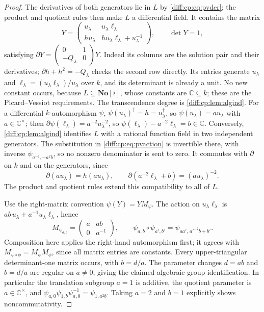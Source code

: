 \documentclass[11pt,letterpaper]{article}
\numberwithin{equation}{section}
\theoremstyle{definition}
\theoremstyle{remark}
\newcommand{\SC}{\mathbf{No}[i]}
\newcommand{\C}{\mathbb C}
\newcommand{\der}{\partial}
\begin{document}
\begin{proof}
The derivatives of both generators lie in $L$ by
\cref{diff:cp:eq:pvder}; the product and quotient rules then
make $L$ a differential field. It contains the matrix
\[
 Y=\begin{pmatrix}u_{\lambda}&u_{\lambda}\ell_{\lambda}\\
 hu_{\lambda}&hu_{\lambda}\ell_{\lambda}+u_{\lambda}^{-1}\end{pmatrix},
 \qquad \det Y=1,
\]
satisfying
$\der Y=\left(\begin{smallmatrix}0&1\\-Q_\lambda&0\end{smallmatrix}\right)Y$.
Indeed its columns are the solution pair and their derivatives;
$\der h+h^2=-Q_\lambda$ checks the second row directly.
Its entries generate $u_{\lambda}$ and
$\ell_{\lambda}=(u_{\lambda}\ell_{\lambda})/u_{\lambda}$ over $k$,
and its determinant is already a unit. No new constant occurs, because $L\subseteq\SC$, whose constants are
$\C\subseteq k$; these are the Picard--Vessiot requirements. The transcendence
degree is \cref{diff:cp:lem:algind}. For a differential $k$-automorphism
$\psi$, $\psi(u_{\lambda})^{\dagger}=h=u_{\lambda}^{\dagger}$, so
$\psi(u_{\lambda})=au_{\lambda}$ with $a\in\C^{\times}$; then
$\der\psi(\ell_{\lambda})=a^{-2}u_{\lambda}^{-2}$, so
$\psi(\ell_{\lambda})-a^{-2}\ell_{\lambda}=b\in\C$. Conversely,
\cref{diff:cp:lem:algind} identifies $L$ with a rational function
field in two independent generators. The substitution in
\cref{diff:cp:eq:pvaction} is invertible there, with inverse
$\psi_{a^{-1},-a^2b}$, so no nonzero denominator is sent to zero.
It commutes with $\der$ on $k$ and on the generators, since
\[
 \der(au_\lambda)=h(au_\lambda),\qquad
 \der(a^{-2}\ell_\lambda+b)=(au_\lambda)^{-2}.
\]
The product and quotient rules extend this compatibility to all
of $L$.

Use the right-matrix convention $\psi(Y)=YM_\psi$. The action on
$u_\lambda\ell_\lambda$ is
$ab\,u_\lambda+a^{-1}u_\lambda\ell_\lambda$, hence
\[
 M_{\psi_{a,b}}=\begin{pmatrix}a&ab\\0&a^{-1}\end{pmatrix},\qquad
 \psi_{a,b}\circ\psi_{a',b'}
 =\psi_{aa',\,a'^{-2}b+b'}.
\]
Composition here applies the right-hand automorphism first; it
agrees with $M_{\psi\circ\phi}=M_\psi M_\phi$, since all matrix
entries are constants. Every upper-triangular determinant-one
matrix occurs, with $b=d/a$. The parameter changes $d=ab$ and
$b=d/a$ are regular on $a\neq0$, giving the claimed algebraic
group identification. In particular the translation subgroup
$a=1$ is additive, the quotient parameter is $a\in\C^\times$,
and
$\psi_{a,0}\psi_{1,b}\psi_{a,0}^{-1}=\psi_{1,a^2b}$.
Taking $a=2$ and $b=1$ explicitly shows noncommutativity.
\end{proof}
\end{document}
